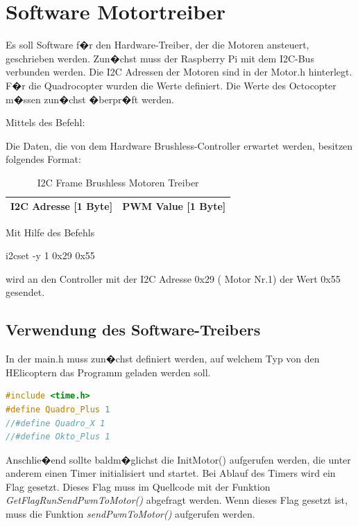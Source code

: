 \section{Software Motortreiber}

Es soll Software f�r den Hardware-Treiber, der die Motoren ansteuert, geschrieben werden. Zun�chst muss der Raspberry Pi mit dem I2C-Bus verbunden werden. 
Die I2C Adressen der Motoren sind in der Motor.h hinterlegt. F�r die Quadrocopter wurden die Werte definiert. Die Werte des Octocopter m�ssen zun�chst �berpr�ft werden.

Mittels des Befehl:

Die Daten, die von dem Hardware Brushless-Controller erwartet werden, besitzen folgendes Format:

	\begin{table}[H]
		\centering
		\begin{tabular}{|c|c|}
			\hline
			I2C Adresse [1 Byte] & PWM Value [1 Byte]\\ \hline
		\end{tabular}
	\caption{I2C Frame Brushless Motoren Treiber}
	\end{table}

Mit Hilfe des Befehls 

\begin{center}
	i2cset -y 1 0x29 0x55
\end{center}

wird an den Controller mit der I2C Adresse 0x29 ( Motor Nr.1) der Wert 0x55 gesendet.

\subsection{Verwendung des Software-Treibers}

In der main.h muss zun�chst definiert werden, auf welchem Typ von den HElicoptern das Programm geladen werden soll.
\begin{lstlisting}[language=C++]
#include <time.h>
#define Quadro_Plus 1
//#define Quadro_X 1
//#define Okto_Plus 1
\end{lstlisting}

Anschlie�end sollte baldm�glichst die InitMotor() aufgerufen werden, die unter anderem einen Timer initialisiert und startet. Bei Ablauf des Timers wird ein Flag gesetzt. Dieses Flag muss im Quellcode mit der Funktion \emph{GetFlagRunSendPwmToMotor()} abgefragt werden. Wenn dieses Flag gesetzt ist, muss die Funktion \emph{sendPwmToMotor()} aufgerufen werden.

